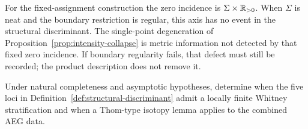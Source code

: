 For the fixed-assignment construction the zero incidence is
$\Sigma\times\mathbb{R}_{>0}$.  When $\Sigma$ is neat and the boundary restriction is
regular, this axis has no event in the structural discriminant.  The
single-point degeneration of Proposition~\ref{prop:intensity-collapse} is
metric information not detected by that fixed zero incidence.  If boundary
regularity fails, that defect must still be recorded; the product description
does not remove it.

\begin{problem}
\label{prob:aeg-discriminant}
Under natural completeness and asymptotic hypotheses, determine when the five
loci in Definition~\ref{def:structural-discriminant} admit a locally finite Whitney
stratification and when a Thom-type isotopy lemma applies to the combined AEG data.
\end{problem}
